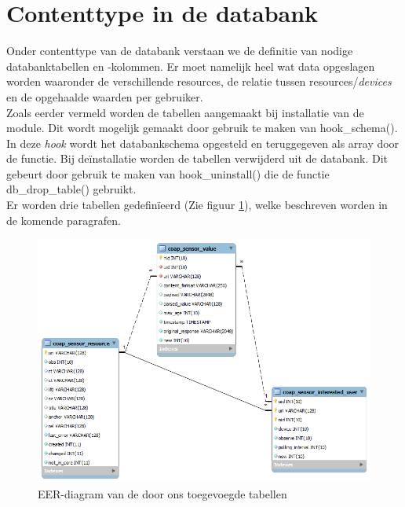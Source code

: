 \newpage
\section{Contenttype in de databank}\label{databankSchema}
Onder contenttype van de databank verstaan we de definitie van nodige databanktabellen en -kolommen. Er moet namelijk heel wat data opgeslagen worden waaronder de verschillende resources, de relatie tussen resources/\textit{devices} en de opgehaalde waarden per gebruiker.\\

Zoals eerder vermeld worden de tabellen aangemaakt bij installatie van de module. Dit wordt mogelijk gemaakt door gebruik te maken van hook\_schema(). In deze \textit{hook} wordt het databankschema opgesteld en teruggegeven als array door de functie. Bij de\"{i}nstallatie worden de tabellen verwijderd uit de databank. Dit gebeurt door gebruik te maken van hook\_uninstall() die de functie db\_drop\_table() gebruikt.\\

\noindent
Er worden drie tabellen gedefin\"{i}eerd (Zie figuur \ref{fig:databankModel}), welke beschreven worden in de komende paragrafen.
\begin{figure}[h!]
\centering
\includegraphics[width=1\textwidth]{fig/databankModel}
\caption{EER-diagram van de door ons toegevoegde tabellen}
\label{fig:databankModel}
\end{figure}

